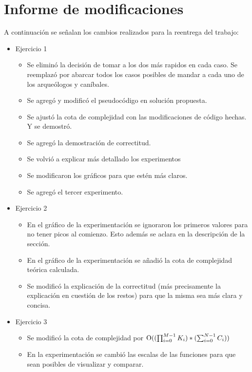 \section{Informe de modificaciones}

A continuación se señalan los cambios realizados para la reentrega del trabajo:

\begin{itemize}
	\item{
		Ejercicio 1
		\begin{itemize}
			\item Se eliminó la decisión de tomar a los dos más rapidos en cada caso. Se reemplazó por abarcar todos los casos posibles de mandar a cada uno de los arqueólogos y caníbales.
			\item Se agregó y modificó el pseudocódigo en solución propuesta.
			\item Se ajustó la cota de complejidad con las modificaciones de código hechas. Y se demostró.
			\item Se agregó la demostración de correctitud.
			\item Se volvió a explicar más detallado los experimentos
			\item Se modificaron los gráficos para que estén más claros.
			\item Se agregó el tercer experimento.
		\end{itemize}
	}
	\item{
		Ejercicio 2
		\begin{itemize}
			\item En el gráfico de la experimentación se ignoraron los primeros
			valores para no tener picos al comienzo. Esto además se aclara en la
			descripción de la sección.
			\item En el gráfico de la experimentación se añadió la cota de complejidad teórica calculada.
			\item Se modificó la explicación de la correctitud (más precisamente la explicación en cuestión de los restos) para que la misma sea más clara y concisa.
		\end{itemize}
	}
	\item{
		Ejercicio 3
		\begin{itemize}
			\item Se modificó la cota de complejidad por $\operatorname{O}((\prod_{i = 0}^{M-1} K_{i})*(\sum_{i = 0}^{N-1} C_{i}))$
			\item En la experimentación se cambió las escalas de las funciones para que sean posibles de visualizar y comparar.
		\end{itemize}
	}
\end{itemize}
